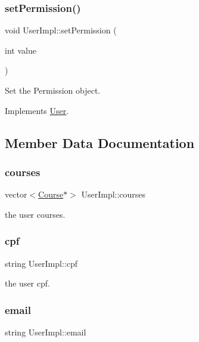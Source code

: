 \subsubsection{\texorpdfstring{set\+Permission()}{setPermission()}}
{\footnotesize\ttfamily void User\+Impl\+::set\+Permission (\begin{DoxyParamCaption}\item[{int}]{value }\end{DoxyParamCaption})\hspace{0.3cm}{\ttfamily [virtual]}}



Set the Permission object. 



Implements \hyperlink{classUser_ab6a6689e3581c70af166b2eb537df6fb}{User}.



\subsection{Member Data Documentation}
\mbox{\label{classUserImpl_a26aab39f0c044fce5ac016bfdbaa0ae6}} 
\subsubsection{\texorpdfstring{courses}{courses}}
{\footnotesize\ttfamily vector$<$\hyperlink{classCourse}{Course}$\ast$$>$ User\+Impl\+::courses\hspace{0.3cm}{\ttfamily [protected]}}

the user courses. \mbox{\label{classUserImpl_a02392facb44ec294182bd5db2008ca19}} 
\subsubsection{\texorpdfstring{cpf}{cpf}}
{\footnotesize\ttfamily string User\+Impl\+::cpf\hspace{0.3cm}{\ttfamily [protected]}}

the user cpf. \mbox{\label{classUserImpl_ad22267401b7861aab1a9ae11968adada}} 
\subsubsection{\texorpdfstring{email}{email}}
{\footnotesize\ttfamily string User\+Impl\+::email\hspace{0.3cm}{\ttfamily [protected]}}

